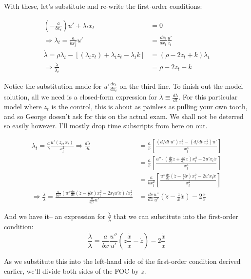 \documentclass[
]{article}
\begin{document}
With these, let's substitute and re-write the first-order conditions:

\begin{align}
\left( -\frac{a}{bx_t}\right)u' + \lambda_tx_t &= 0 \\
\Rightarrow \lambda_t = \frac{a}{bx_t^2}u' &= \frac{d c_t}{d x_t}\frac{u'}{z_t} \\
\dot{\lambda} = \rho \lambda_t - \left[ (\lambda_t z_t) + \lambda_t z_t - \lambda_t k \right] &= (\rho - 2z_t + k)\lambda_t \\
\Rightarrow \frac{\dot{\lambda}}{\lambda_t} &= \rho - 2z_t + k

\end{align}

Notice the substitution made for \(u'\frac{d c_t}{d x_t}\) on the third
line. To finish out the model solution, all we need is a closed-form
expression for \(\dot{\lambda} \equiv \frac{d\lambda}{dt}\). For this
particular model where \(z_t\) is the control, this is about as painless
as pulling your own tooth, and so George doesn't ask for this on the
actual exam. We shall not be deterred so easily however. I'll mostly
drop time subscripts from here on out.

\begin{align}

\lambda_t = \frac{a}{b}\frac{u'(z_t , x_t)}{x_t^2} \Rightarrow \frac{d\lambda}{dt} &= \frac{a}{b}\left[\frac{(d/dt \ u')x_t^2 - (d/dt \ x_t^2)u'}{x_t^4}\right] \\
&= \frac{a}{b}\left[\frac{u''\cdot(\frac{d c}{d z}\dot{z} + \frac{d c}{d x}\dot{x})x_t^2 - 2u'x_t\dot{x}}{x_t^4} \right] \\ 
&= \frac{a}{bx_t^2}\left[\frac{u''\frac{d c}{d z}(\dot{z} - \frac{z}{x}\dot{x})x_t^2 - 2u'x_t\dot{x}}{x_t^2} \right] \\
\Rightarrow \frac{\dot{\lambda}}{\lambda} = \frac{\frac{a}{bx^2}(u''\frac{d c}{d z}(\dot{z} - \frac{z}{x}\dot{x})x_t^2 - 2x_tu'\dot{x})/x_t^2}{\frac{a}{bx^2}u'} &= \frac{d c}{d z}\frac{u''}{u'}(\dot{z} - \frac{z}{x}\dot{x}) - 2\frac{\dot{x}}{x}

\end{align}

And we have it-- an expression for \(\frac{\dot{\lambda}}{\lambda}\)
that we can substitute into the first-order condition:
\[ \frac{\dot{\lambda}}{\lambda} = \frac{a}{bx}\frac{u''}{u'}\left(z\frac{\dot{x}}{x} - \dot{z}\right) - 2\frac{\dot{x}}{x} \]

As we substitute this into the left-hand side of the first-order
condition derived earlier, we'll divide both sides of the FOC by \(z\).
\end{document}

